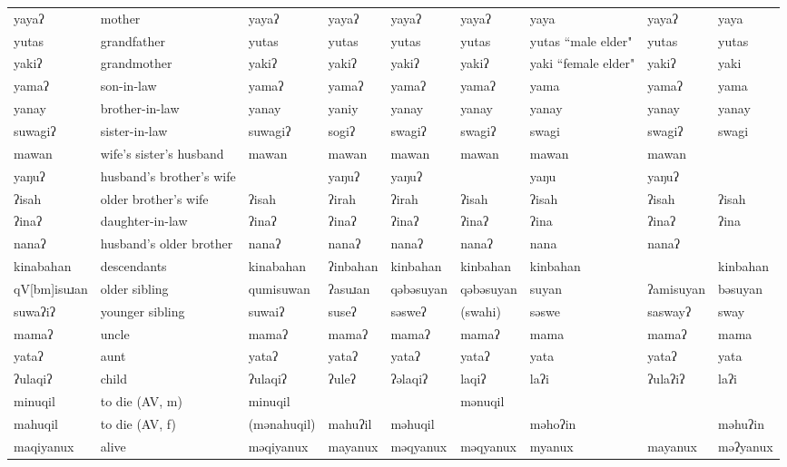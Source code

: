 \begin{landscape}
\begin{longtable}{*{9}{>{\raggedright\arraybackslash}p{}}}
\text{*}yayaʔ & mother & yayaʔ & yayaʔ & yayaʔ & yayaʔ & yaya & yayaʔ & yaya\\
\text{*}yutas & grandfather & yutas & yutas & yutas & yutas & yutas \newline ``male elder" & yutas & yutas\\
\text{*}yakiʔ & grandmother & yakiʔ & yakiʔ & yakiʔ & yakiʔ & yaki \newline ``female elder" & yakiʔ & yaki\\
\text{*}yamaʔ & son-in-law & yamaʔ & yamaʔ & yamaʔ & yamaʔ & yama & yamaʔ & yama\\
\text{*}yanay & brother-in-law & yanay & yaniy & yanay & yanay & yanay & yanay & yanay\\
\text{*}suwagiʔ & sister-in-law & suwagiʔ & sogiʔ & swagiʔ & swagiʔ & swagi & swagiʔ & swagi\\
\text{*}mawan & wife's sister's husband & mawan & mawan & mawan & mawan & mawan & mawan & \\
\text{*}yaŋuʔ & husband's brother's wife &  & yaŋuʔ & yaŋuʔ &  & yaŋu & yaŋuʔ & \\
\text{*}ʔisah & older brother's wife & ʔisah & ʔirah & ʔirah & ʔisah & ʔisah & ʔisah & ʔisah\\
\text{*}ʔinaʔ & daughter-in-law & ʔinaʔ & ʔinaʔ & ʔinaʔ & ʔinaʔ & ʔina & ʔinaʔ & ʔina\\
\text{*}nanaʔ & husband's older brother & nanaʔ & nanaʔ & nanaʔ & nanaʔ & nana & nanaʔ & \\
\text{*}kinabahan & descendants & kinabahan & ʔinbahan & kinbahan & kinbahan & kinbahan &  & kinbahan\\
\text{*}qV[bm]isuɹan & older sibling & qumisuwan & ʔasuɹan & qəbəsuyan & qəbəsuyan & suyan & ʔamisuyan & bəsuyan\\
\text{*}suwaʔiʔ & younger sibling & suwaiʔ & suseʔ & səsweʔ & (swahi) & səswe & saswayʔ & sway\\
\text{*}mamaʔ & uncle & mamaʔ & mamaʔ & mamaʔ & mamaʔ & mama & mamaʔ & mama\\
\text{*}yataʔ & aunt & yataʔ & yataʔ & yataʔ & yataʔ & yata & yataʔ & yata\\
\text{*}ʔulaqiʔ & child & ʔulaqiʔ & ʔuleʔ & ʔəlaqiʔ & laqiʔ & laʔi & ʔulaʔiʔ & laʔi\\
\text{*}minuqil & to die (AV, m) & minuqil &  &  & mənuqil &  &  & \\
\text{*}mahuqil & to die (AV, f) & (mənahuqil) & mahuʔil & məhuqil &  & məhoʔin &  & məhuʔin\\
\text{*}maqiyanux & alive & məqiyanux & mayanux & məqyanux & məqyanux & myanux & mayanux & məʔyanux\\

\end{longtable}
\end{landscape}

